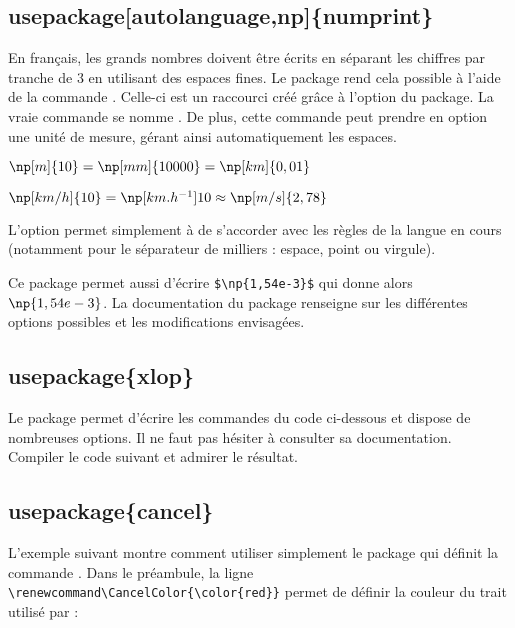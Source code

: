 \subsection{usepackage[autolanguage,np]\{numprint\}}

En français, les grands nombres doivent être écrits en séparant les chiffres par tranche de $3$ en utilisant des espaces fines. Le package  rend cela possible à l'aide de la commande . Celle-ci est un raccourci créé grâce à l'option  du package. La vraie commande se nomme . De plus, cette commande peut prendre en option une unité de mesure, gérant ainsi automatiquement les espaces.\bigskip

{\NewFont
\begin{SideBySideExample}
    $\np[m]{10} = \np[mm]{10000} = \np[km]{0,01}$\par
    $\np[km/h]{10} = \np[km.h^{-1}]{10}
    \approx \np[m/s]{2,78}$
\end{SideBySideExample}
}\bigskip

\begin{info}
    L'option  permet simplement à  de s'accorder avec les règles de la langue en cours (notamment pour le séparateur de milliers : espace, point ou virgule).
\end{info}

Ce package permet aussi d'écrire \verb!$\np{1,54e-3}$! qui donne alors $\np{1,54e-3}$. La documentation du package renseigne sur les différentes options possibles et les modifications envisagées.

\subsection{usepackage\{xlop\}}

Le package  permet d'écrire les commandes du code ci-dessous et dispose de nombreuses options. Il ne faut pas hésiter à consulter sa documentation. Compiler le code suivant et admirer le résultat.


\subsection{usepackage\{cancel\}}

L'exemple suivant montre comment utiliser simplement le package  qui définit la commande . Dans le préambule, la ligne \verb!\renewcommand\CancelColor{\color{red}}! permet de définir la couleur du trait utilisé par  :\bigskip

